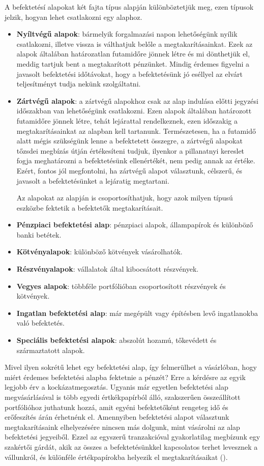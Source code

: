 	A befektetésí alapokat két fajta típus alapján különböztetjük meg, ezen típusok jelzik, hogyan lehet csatlakozni egy alaphoz.
\begin{itemize}
\item \textbf{Nyíltvégű alapok}: bármelyik forgalmazási napon lehetőségünk nyílik csatlakozni, illetve vissza is válthatjuk belőle a megtakarításainkat. Ezek az alapok általában határozatlan futamidőre jönnek létre és mi dönthetjük el, meddig tartjuk bent a megtakarított pénzünket. Mindig érdemes figyelni a javasolt befektetési időtávokat, hogy a befektetésünk jó eséllyel az elvárt teljesítményt tudja nekünk szolgáltatni.
\item \textbf{Zártvégű alapok}: a zártvégű alapokhoz csak az alap indulása előtti jegyzési időszakban van lehetőségünk csatlakozni. Ezen alapok általában határozott futamidőre jönnek létre, tehát lejárattal rendelkeznek, ezen időszakig a megtakarításainkat az alapban kell tartanunk. Természetesen, ha a futamidő alatt mégis szükségünk lenne a befektetett összegre, a zártvégű alapokat tőzsdei megbízás útján értékesíteni tudjuk, ilyenkor a pillanatnyi kereslet fogja meghatározni a befektetésünk ellenértékét, nem pedig annak az értéke. Ezért, fontos jól megfontolni, ha zártvégű alapot választunk, célszerű, és javasolt a befektetésünket a lejáratig megtartani.  

	Az alapokat az alapján is csoportosíthatjuk, hogy azok milyen típusú eszközbe fektetik a befektetők megtakarításait.  

\end{itemize}
\begin{itemize}
\item \textbf{Pénzpiaci befektetési alap}: pénzpiaci alapok, állampapírok és különböző banki betétek.
\item \textbf{Kötvényalapok}: különböző kötvények vásárolhatók.
\item \textbf{Részvényalapok}: vállalatok által kibocsátott részvények.
\item \textbf{Vegyes alapok}: többféle portfólióban csoportosított részvények és  kötvények.
\item \textbf{Ingatlan befektetési alap}: már megépült vagy építésben levő ingatlanokba való befektetés.
\item \textbf{Speciális befektetési alapok}: abszolút hozamú, tőkevédett és származtatott alapok. 
\end{itemize}

	Mivel ilyen sokrétű lehet egy befektetési alap, így felmerülhet a vásárlóban, hogy miért érdemes befektetési alapba fektetnie a pénzét? Erre a kérdésre az egyik legjobb érv a kockázatmegosztás. Ugyanis már egyetlen befektetési alap megvásárlásával is több egyedi értkékpapírból álló, szakszerűen összeállított portfólióhoz juthatunk hozzá, amit egyéni befektetőként rengeteg idő és erőfeszítés árán érhetnénk el. Amennyiben befektetési alapot választunk megtakarításaink elhelyezésére nincsen más dolgunk, mint vásárolni az alap befektetési jegyeiből. Ezzel az egyszerű tranzakcióval gyakorlatilag megbízunk egy szakértői gárdát, akik az összes a befektetésünkkel kapcsolatos terhet levesznek a vállunkról, és különféle értékpapírokba helyezik el megtakarításaikat ().

